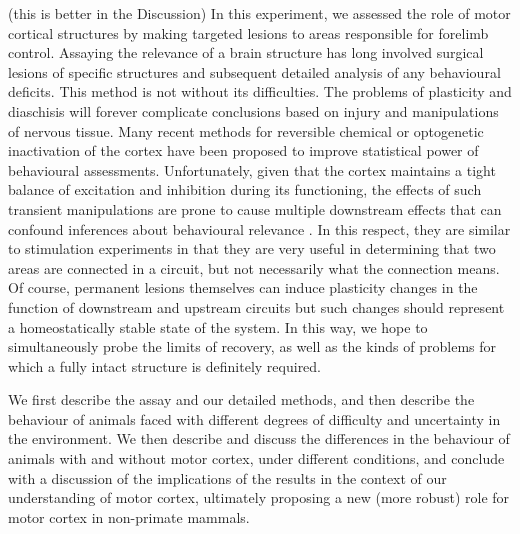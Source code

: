 (this is better in the Discussion) In this experiment, we assessed the role of motor cortical structures by making targeted lesions to areas responsible for forelimb control. Assaying the relevance of a brain structure has long involved surgical lesions of specific structures and subsequent detailed analysis of any behavioural deficits. This method is not without its difficulties. The problems of plasticity and diaschisis will forever complicate conclusions based on injury and manipulations of nervous tissue. Many recent methods for reversible chemical or optogenetic inactivation of the cortex have been proposed to improve statistical power of behavioural assessments. Unfortunately, given that the cortex maintains a tight balance of excitation and inhibition during its functioning, the effects of such transient manipulations are prone to cause multiple downstream effects that can confound inferences about behavioural relevance \cite{Otchy2015}. In this respect, they are similar to stimulation experiments in that they are very useful in determining that two areas are connected in a circuit, but not necessarily what the connection means. Of course, permanent lesions themselves can induce plasticity changes in the function of downstream and upstream circuits but such changes should represent a homeostatically stable state of the system. In this way, we hope to simultaneously probe the limits of recovery, as well as the kinds of problems for which a fully intact structure is definitely required.

We first describe the assay and our detailed methods, and then describe the behaviour of animals faced with different degrees of difficulty and uncertainty in the environment. We then describe and discuss the differences in the behaviour of animals with and without motor cortex, under different conditions, and conclude with a discussion of the implications of the results in the context of our understanding of motor cortex, ultimately proposing a new (more robust) role for motor cortex in non-primate mammals.
